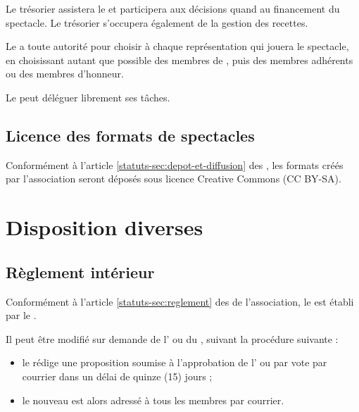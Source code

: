 \documentclass[a4paper,french,10pt]{article}
\newcommand{\article}[1]{\subsection{#1}\addtocounter{article}{1}}
\newcounter{article}
\newcommand{\artrefst}[1]{article \ref{statuts-#1} des \statuts{}}
\begin{document}
Le trésorier assistera le \DA{} et participera aux décisions quand au financement du spectacle. Le trésorier s'occupera également de la gestion des recettes.

Le \DA{} a toute autorité pour choisir à chaque représentation qui jouera le spectacle, en choisissant autant que possible des membres de \troupe{}, puis des membres adhérents ou des membres d'honneur.

Le \DA{} peut déléguer librement ses tâches.

\article{Licence des formats de spectacles}
\label{sec:licence-des-formats}
Conformément à l'\artrefst{sec:depot-et-diffusion}, les formats créés par l'association seront déposés sous licence Creative Commons (CC BY-SA).


\section{Disposition diverses}
\article{Règlement intérieur}
\label{sec:reglement-interieur}
Conformément à l'\artrefst{sec:reglement} de l'association, le \RI{} est établi par le \bureau{}.

Il peut être modifié sur demande de l'\AG{} ou du \bureau{}, suivant la procédure suivante :
\begin{itemize}
\item le \bureau{} rédige une proposition soumise à l'approbation de l'\AG{} ou par vote par courrier dans un délai de quinze (15) jours ;
\item le nouveau \RI{} est alors adressé à tous les membres par courrier.
\end{itemize}
\end{document}
